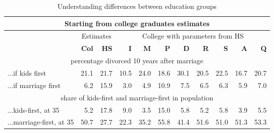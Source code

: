 \documentclass[12pt,letter]{article}
\begin{document}
\begin{table}[p]
\begin{center}
\caption{Understanding differences between education groups\label{educ-diffs}}
\begin{tabular}{l r r | r r r r r r r r}\hline\hline
 \multicolumn{11}{c}{\textbf{Starting from college graduates estimates}}\\\hline
 & \multicolumn{2}{c|}{Estimates} & \multicolumn{8}{c}{College with parameters from HS}\\\hline
 & \textbf{Col} & \textbf{HS} & \textbf{I} & \textbf{M} & \textbf{P} & \textbf{D} & \textbf{R} & \textbf{S} & \textbf{A} & \textbf{Q} \\\hline
\multicolumn{11}{c}{\footnotesize percentage divorced 10 years after marriage}\\\hline
{\footnotesize ...if kids first} & 21.1 & 21.7 & 10.5 & 24.0 & 18.6 & 30.1 & 20.5 & 22.5 & 16.7 & 20.7 \\
{\footnotesize ...if marriage first} & 6.2 & 15.9 & 3.0 & 4.9 & 10.9 & 7.5 & 6.5 & 6.3 & 5.9 & 7.0 \\\hline
\multicolumn{11}{c}{\footnotesize share of kids-first and marriage-first in population}\\\hline
{\footnotesize ...kids-first, at 35} & 5.2 & 17.8 & 9.0 & 3.5 & 15.0 & 5.8 & 5.2 & 5.8 & 3.9 & 5.5 \\
{\footnotesize ...marriage-first, at 35} & 50.7 & 27.7 & 22.3 & 35.2 & 55.8 & 41.4 & 51.6 & 51.0 & 51.3 & 53.3\\\hline

\end{tabular}
\end{center}
\end{table}
\end{document}
